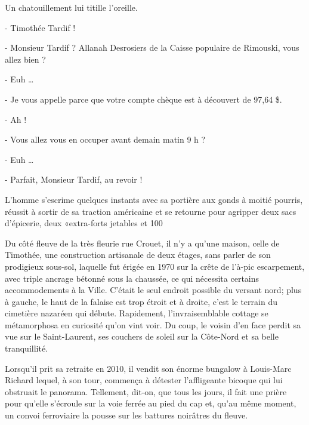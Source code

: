 
Un chatouillement lui titille l’oreille.

- Timothée Tardif !

- Monsieur Tardif ? Allanah Desrosiers de la Caisse populaire de Rimouski, vous allez bien ?

- Euh …

- Je vous appelle parce que votre compte chèque est à découvert de 97,64 \$.

- Ah !

- Vous allez vous en occuper avant demain matin 9 h ?

- Euh …

- Parfait, Monsieur Tardif, au revoir !

L’homme s’escrime quelques instants avec sa portière aux gonds à moitié pourris, réussit à sortir de sa traction américaine et se retourne pour agripper deux sacs d’épicerie, deux «extra-forts jetables et 100 %

Du côté fleuve de la très fleurie rue Crouet, il n’y a qu’une maison, celle de Timothée, une construction artisanale de deux étages, sans parler de son prodigieux sous-sol, laquelle fut érigée en 1970 sur la crête de l’à-pic escarpement, avec triple ancrage bétonné sous la chaussée, ce qui nécessita certains accommodements à la Ville. C’était le seul endroit possible du versant nord; plus à gauche, le haut de la falaise est trop étroit et à droite, c’est le terrain du cimetière nazaréen qui débute. Rapidement, l’invraisemblable cottage se métamorphosa en curiosité qu’on vint voir. Du coup, le voisin d’en face perdit sa vue sur le Saint-Laurent, ses couchers de soleil sur la Côte-Nord et sa belle tranquillité.

Lorsqu’il prit sa retraite en 2010, il vendit son énorme bungalow à Louis-Marc Richard lequel, à son tour, commença à détester l’affligeante bicoque qui lui obstruait le panorama. Tellement, dit-on, que tous les jours, il fait une prière pour qu’elle s’écroule sur la voie ferrée au pied du cap et, qu’au même moment, un convoi ferroviaire la pousse sur les battures noirâtres du fleuve.

